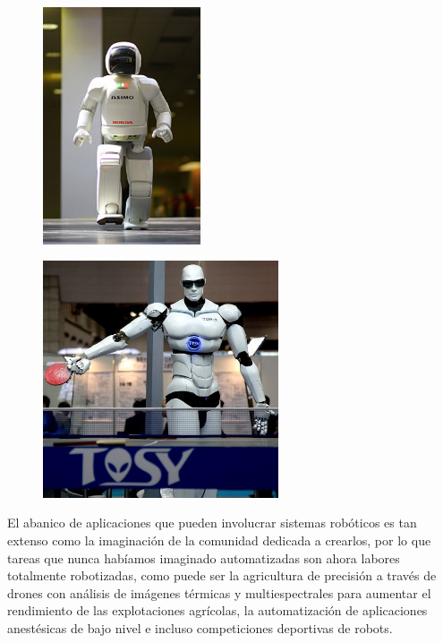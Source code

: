 \begin{figure}[h]
	\centering
	\begin{minipage}[h]{.48\linewidth}
		\centering
		\includegraphics[width=.5\linewidth, height=7cm]{figures/asimo.png}
		\label{fig:asimo}
	\end{minipage}
	\begin{minipage}[h]{.48\linewidth}
		\centering
		\includegraphics[width=.7\linewidth, height=7cm]{figures/topio.jpg}
		\label{fig:topio}
	\end{minipage}
\end{figure}

El abanico de aplicaciones que pueden involucrar sistemas robóticos es tan extenso como la imaginación de la comunidad dedicada a crearlos, por lo que tareas que nunca habíamos imaginado automatizadas son ahora labores totalmente robotizadas, como puede ser la agricultura de precisión a través de drones con análisis de imágenes térmicas y multiespectrales para aumentar el rendimiento de las explotaciones agrícolas, la automatización de aplicaciones anestésicas de bajo nivel e incluso competiciones deportivas de robots. 

